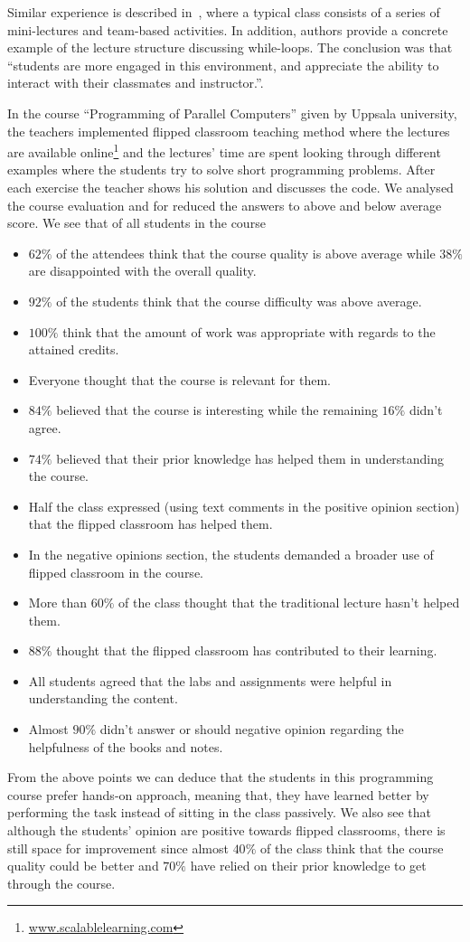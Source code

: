 \documentclass{article}
\begin{document}
Similar experience is described in~\cite{cordes2002active}, where a
typical class consists of a series of mini-lectures and team-based
activities.  In addition, authors provide a concrete example of the
lecture structure discussing while-loops. The conclusion was that
``students are more engaged in this environment, and appreciate the
ability to interact with their classmates and instructor.''.

In the course ``Programming of Parallel Computers'' given by Uppsala university,
the teachers implemented flipped classroom teaching method where the
lectures are available online\footnote{\url{www.scalablelearning.com}}
and the lectures' time are spent looking through different examples
where the students try to solve short programming problems. After each
exercise the teacher shows his solution and discusses the code. We
analysed the course evaluation and for reduced the answers to above
and below average score. We see that of all students in the course
\begin{itemize}
	\item $62\%$ of the attendees think that the course quality is
		above average while $38\%$ are disappointed with the
		overall quality.
	\item $92\%$ of the students think that the course difficulty
		was above average.
	\item $100\%$ think that the amount of work was appropriate
		with regards to the attained credits.
	\item Everyone thought that the course is relevant for them.
	\item $84\%$ believed that the course is interesting while the
		remaining $16\%$ didn't agree.
	\item $74\%$ believed that their prior knowledge has helped
		them in understanding the course.
	\item Half the class expressed (using text comments in the
		positive opinion section) that the flipped classroom has helped them.
	\item In the negative opinions section, the students demanded
		a broader use of flipped classroom in the course.
	\item More than $60\%$ of the class thought that the
		traditional lecture hasn't helped them.
	\item $88\%$ thought that the flipped classroom has
		contributed to their learning.
	\item All students agreed that the labs and assignments were helpful in
		understanding the content.
	\item Almost $90\%$ didn't answer or should negative opinion
		regarding the helpfulness of the books and notes.
\end{itemize}
From the above points we can deduce that the students in this
programming course prefer hands-on approach, meaning that, they have
learned better by performing the task instead of sitting in the class
passively. We also see that although the students' opinion are
positive towards flipped classrooms, there is still space for
improvement since almost $40\%$ of the class think that the course
quality could be better and $70\%$ have relied on their prior
knowledge to get through the course.
\end{document}
